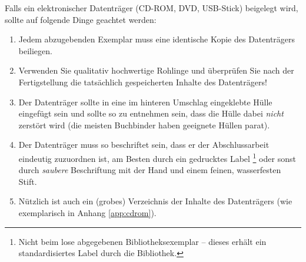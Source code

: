 Falls ein elektronischer Datenträger (CD-ROM, DVD, USB-Stick) beigelegt
wird, sollte auf folgende Dinge geachtet werden:
%
\begin{enumerate}
\item Jedem abzugebenden Exemplar muss eine identische Kopie des
Datenträgers beiliegen. %
\item Verwenden Sie qualitativ hochwertige Rohlinge und überprüfen
Sie nach der Fertigstellung die tatsächlich gespeicherten Inhalte
des Datenträgers! %
\item Der Datenträger sollte in eine im hinteren Umschlag
eingeklebte Hülle eingefügt sein und sollte so zu entnehmen sein,
dass die Hülle dabei \emph{nicht} zerstört wird (die
meisten Buchbinder haben geeignete Hüllen parat). %
\item Der Datenträger muss so beschriftet sein, dass er der
Abschlussarbeit eindeutig zuzuordnen ist, am Besten durch ein
gedrucktes Label%
\footnote{Nicht beim lose abgegebenen Bibliotheksexemplar --
dieses erhält ein standardisiertes Label durch die Bibliothek.} %
oder sonst durch \emph{saubere}
Beschriftung mit
der Hand und einem feinen, wasserfesten Stift. %
\item Nützlich ist auch ein (grobes) Verzeichnis der Inhalte des
Datenträgers (wie exemplarisch in Anhang \ref{app:cdrom}).
\end{enumerate}
